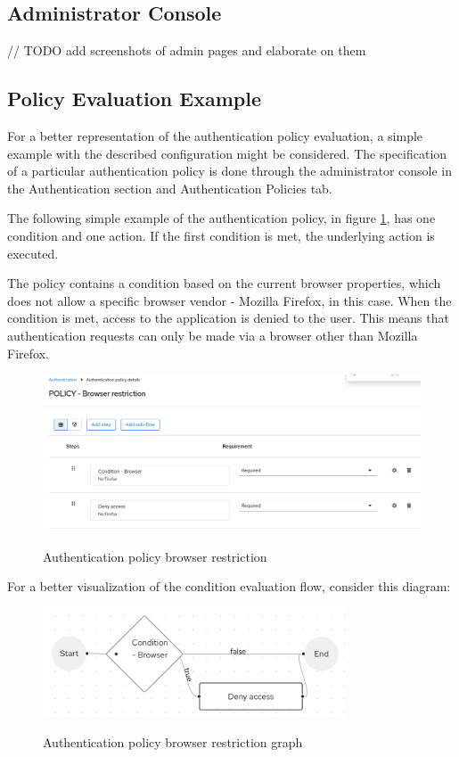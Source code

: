 \subsection{Administrator Console}
// TODO add screenshots of admin pages and elaborate on them

\subsection{Policy Evaluation Example}
For a better representation of the authentication policy evaluation, a simple example with the described configuration might be considered.
The specification of a particular authentication policy is done through the administrator console in the Authentication section and Authentication Policies tab.

The following simple example of the authentication policy, in figure \ref{fig:design-policy-browser-flow}, has one condition and one action.
If the first condition is met, the underlying action is executed.

The policy contains a condition based on the current browser properties, which does not allow a specific browser vendor - Mozilla Firefox, in this case.
When the condition is met, access to the application is denied to the user.
This means that authentication requests can only be made via a browser other than Mozilla Firefox.

\begin{figure}[htbp]
  \centering
  \includegraphics[width=1\textwidth]{img/sections/5-design/policy-browser-flow.png}
  \label{fig:design-policy-browser-flow}
  \caption{Authentication policy browser restriction}
\end{figure}

For a better visualization of the condition evaluation flow, consider this diagram:

\begin{figure}[htbp]
  \centering
  \includegraphics[width=0.8\textwidth]{img/sections/5-design/policy-browser-flow-graph.png}
  \label{fig:design-policy-browser-flow-graph}
  \caption{Authentication policy browser restriction graph}
\end{figure}


